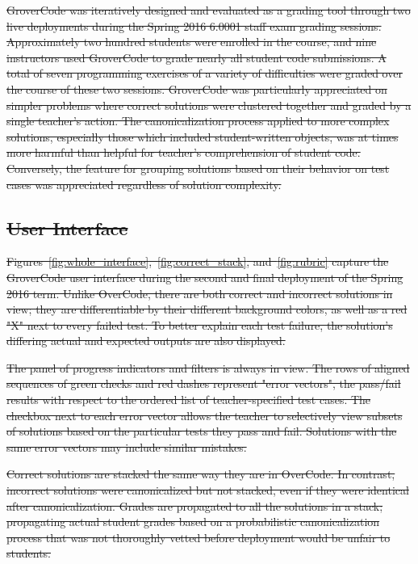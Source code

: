 \documentclass[12pt,twoside]{mitthesis}
\providecommand{\DIFdeltex}[1]{{\protect\color{red}\sout{#1}}}                      %
\providecommand{\DIFdel}[1]{\texorpdfstring{\DIFdeltex{#1}}{}} %
\begin{document}
{{{{{{{{{{%
\DIFdel{GroverCode was iteratively designed and evaluated as a grading tool through two live deployments during the Spring 2016 6.0001 staff exam grading sessions. Approximately two hundred students were enrolled in the course, and nine instructors used GroverCode to grade nearly all student code submissions. A total of seven programming exercises of a variety of difficulties were graded over the course of these two sessions. GroverCode was particularly appreciated on simpler problems where correct solutions were clustered together and graded by a single teacher's action. The canonicalization process applied to more complex solutions, especially those which included student-written objects, was at times more harmful than helpful for teacher's comprehension of student code. Conversely, the feature for grouping solutions based on their behavior on test cases was appreciated regardless of solution complexity.
}%

\subsection{\DIFdel{User Interface}}
\addtocounter{subsection}{-1}%

\DIFdel{Figures~\ref{fig:whole_interface},~\ref{fig:correct_stack}, and~\ref{fig:rubric} capture the GroverCode user interface during the second and final deployment of the Spring 2016 term. Unlike OverCode, there are both correct and incorrect solutions in view; they are differentiable by their different background colors, as well as a red "X" next to every failed test. To better explain each test failure, the solution's differing actual and expected outputs are also displayed. 
}%

\DIFdel{The panel of progress indicators and filters is always in view. The rows of aligned sequences of green checks and red dashes represent "error vectors", the pass/fail results with respect to the ordered list of teacher-specified test cases. The checkbox next to each error vector allows the teacher to selectively view subsets of solutions based on the particular tests they pass and fail. Solutions with the same error vectors may include similar mistakes.
}%

\DIFdel{Correct solutions are stacked the same way they are in OverCode. In contrast, incorrect solutions were canonicalized but not stacked, even if they were identical after canonicalization. Grades are propagated to all the solutions in a stack; propagating actual student grades based on a probabilistic canonicalization process that was not thoroughly vetted before deployment would be unfair to students. 
}%

}}}}}}}}}}
\end{document}
